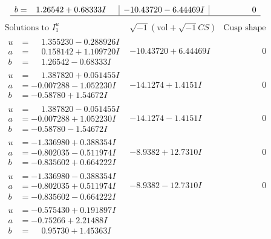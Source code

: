 \documentclass[1p]{elsarticle_modified}
\theoremstyle{definition}
\newcommand{\I}{\sqrt{-1}}
\begin{document}
$$\begin{array}{c|c|c}
\begin{aligned}
b &= \phantom{-}1.26542 + 0.68333 I\end{aligned}
 & -10.43720 - 6.44469 I & \phantom{-0.000000 } 0\\
 \hline 
 \end{array}$$\newpage$$\begin{array}{c|c|c}  
\text{Solutions to }I^u_{1}& \I (\text{vol} + \sqrt{-1}CS) & \text{Cusp shape}\\
 \hline 
\begin{aligned}
u &= \phantom{-}1.355230 - 0.288926 I \\
a &= \phantom{-}0.158142 + 1.109720 I \\
b &= \phantom{-}1.26542 - 0.68333 I\end{aligned}
 & -10.43720 + 6.44469 I & \phantom{-0.000000 } 0 \\ \hline\begin{aligned}
u &= \phantom{-}1.387820 + 0.051455 I \\
a &= -0.007288 - 1.052230 I \\
b &= -0.58780 + 1.54672 I\end{aligned}
 & -14.1274 + 1.4151 I & \phantom{-0.000000 } 0 \\ \hline\begin{aligned}
u &= \phantom{-}1.387820 - 0.051455 I \\
a &= -0.007288 + 1.052230 I \\
b &= -0.58780 - 1.54672 I\end{aligned}
 & -14.1274 - 1.4151 I & \phantom{-0.000000 } 0 \\ \hline\begin{aligned}
u &= -1.336980 + 0.388354 I \\
a &= -0.802035 - 0.511974 I \\
b &= -0.835602 + 0.664222 I\end{aligned}
 & -8.9382 + 12.7310 I & \phantom{-0.000000 } 0 \\ \hline\begin{aligned}
u &= -1.336980 - 0.388354 I \\
a &= -0.802035 + 0.511974 I \\
b &= -0.835602 - 0.664222 I\end{aligned}
 & -8.9382 - 12.7310 I & \phantom{-0.000000 } 0 \\ \hline\begin{aligned}
u &= -0.575430 + 0.191897 I \\
a &= -0.75266 + 2.21488 I \\
b &= \phantom{-}0.95730 + 1.45363 I\end{aligned}

\end{array}$$
\end{document}
